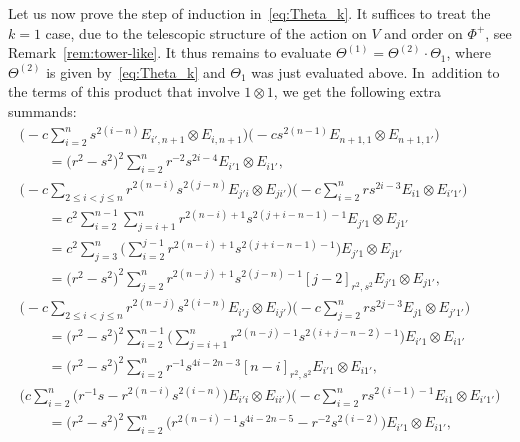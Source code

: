 \documentclass[10pt,a4paper]{amsart}
\numberwithin{equation}{section}
\begin{document}
Let
us now prove the step of induction in~\eqref{eq:Theta_k}. It suffices to treat the $k=1$ case, due to the telescopic structure of the action on $V$ and order on $\Phi^+$, see Remark~\ref{rem:tower-like}. It thus remains to evaluate $\Theta^{(1)}=\Theta^{(2)}\cdot \Theta_1$, where $\Theta^{(2)}$ is given by~\eqref{eq:Theta_k} and $\Theta_1$ was just evaluated above. In~addition to the terms of this product that involve $1 \otimes 1$, we get the following extra summands:
\begin{gather}
 \Biggl(-c\sum_{i = 2}^{n} s^{2(i -n)}E_{i',n + 1} \otimes E_{i,n + 1}\Biggr) \bigl(-cs^{2(n - 1)}E_{n + 1,1} \otimes E_{n + 1,1'} \bigr) \nonumber\\
 \qquad{}= \bigl(r^{2} - s^{2}\bigr)^{2}\sum_{i = 2}^{n}r^{-2}s^{2i - 4}E_{i'1} \otimes E_{i1'},\label{eq:term_a}
\\
 \Biggl(-c\sum_{2 \le i < j \le n}r^{2(n - i)}s^{2(j - n)}E_{j'i} \otimes E_{ji'}\Biggr) \Biggl(-c\sum_{i = 2}^{n}rs^{2i - 3}E_{i1} \otimes E_{i'1'}\Biggr) \nonumber\\
 \qquad{}=
 c^{2}\sum_{i = 2}^{n-1}\sum_{j = i + 1}^{n} r^{2(n - i) + 1}s^{2(j + i - n -1) - 1}E_{j'1} \otimes E_{j1'} \nonumber\\
 \qquad{}=
 c^{2}\sum_{j = 3}^{n}\Biggl( \sum_{i = 2}^{j - 1}r^{2(n - i) + 1}s^{2(j + i - n -1) - 1}\Biggr)E_{j'1} \otimes E_{j1'} \nonumber\\
 \qquad{}=
 \bigl(r^{2} - s^{2}\bigr)^{2}\sum_{j = 2}^{n}r^{2(n - j) + 1}s^{2(j - n) - 1}[j - 2]_{r^{2},s^{2}}E_{j'1} \otimes E_{j1'},\label{eq:term_b}
\\
 \Biggl(-c\sum_{2 \le i < j \le n}r^{2(n - j)}s^{2(i - n)}E_{i'j} \otimes E_{ij'}\Biggr)\Biggl(-c\sum_{j = 2}^{n}rs^{2j - 3}E_{j1} \otimes E_{j'1'}\Biggr) \nonumber\\
 \qquad{}=
 \bigl(r^{2} - s^{2}\bigr)^{2}\sum_{i = 2}^{n-1}\Biggl( \sum_{j = i + 1}^{n}r^{2(n - j)-1}s^{2(i + j - n - 2) - 1}\Biggr) E_{i'1} \otimes E_{i1'} \nonumber\\
 \qquad{}=
 \bigl(r^{2} -s^{2}\bigr)^{2}\sum_{i = 2}^{n}r^{-1}s^{4i - 2n - 3}[n - i]_{r^{2},s^{2}}E_{i'1} \otimes E_{i1'},\label{eq:term_c}
\\
 \Biggl(c\sum_{i = 2}^{n}\bigl(r^{-1}s - r^{2(n - i)}s^{2(i - n)}\bigr)E_{i'i} \otimes E_{ii'} \Biggr)\Biggl(-c\sum_{i = 2}^{n}rs^{2(i - 1) -1}E_{i1} \otimes E_{i'1'}\Biggr) \nonumber\\
 \qquad{}=
 \bigl(r^{2} - s^{2}\bigr)^{2}\sum_{i = 2}^{n}\bigl(r^{2(n - i) -1}s^{4i - 2n -5} -r^{-2}s^{2(i - 2)}\bigr)E_{i'1} \otimes E_{i1'},\label{eq:term_d}

\end{gather}
\end{document}
